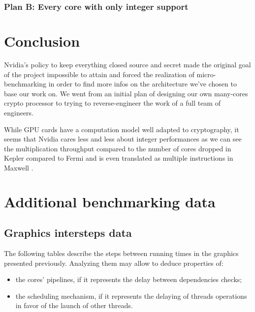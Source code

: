 \documentclass{report}
\begin{document}
   \subsection{Plan B: Every core with only integer support}
   
\chapter{Conclusion}
    Nvidia's policy to keep everything closed source and secret made the original 
    goal of the project impossible to attain and forced the realization of micro-benchmarking 
    in order to find more infos on the architecture we've chosen to base our work on. We went 
    from an initial plan of designing our own many-cores crypto processor to trying to 
    reverse-engineer the work of a full team of engineers.
    
    While GPU cards have a computation model well adapted to cryptography, it seems that Nvidia
    cares less and less about integer performances as we can see the multiplication throughput
    compared to the number of cores dropped in Kepler compared to Fermi and is even translated as
    multiple instructions in Maxwell \cite{cudaprog}.
   
  \appendix 
   
\chapter{Additional benchmarking data}
    \section{Graphics intersteps data}
    The following tables describe the steps between running times in the graphics presented previously. Analyzing them may allow to deduce properties of: 
    \begin{itemize} 
        \item the cores' pipelines, if it represents the delay between dependencies checks;
        \item the scheduling mechanism, if it represents the delaying of threads operations in favor of the launch of other threads.
    \end{itemize}
    
    \centering
    
    
    \pagebreak
    
\end{document}
